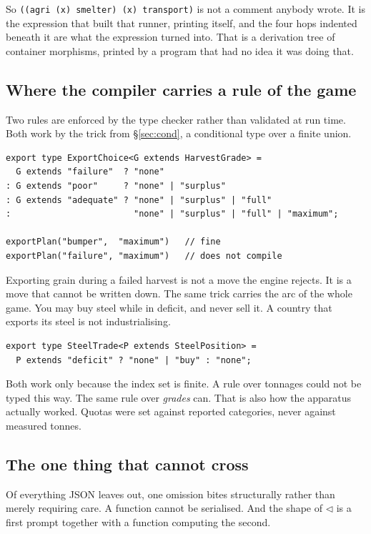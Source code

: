 \documentclass[11pt,a4paper]{article}
\begin{document}
So \texttt{((agri (x) smelter) (x) transport)} is not a comment anybody wrote. It is the expression
that built that runner, printing itself, and the four hops indented beneath it are what the
expression turned into. That is a derivation tree of container morphisms, printed by a program that
had no idea it was doing that.

\subsection{Where the compiler carries a rule of the game}

Two rules are enforced by the type checker rather than validated at run time. Both work by the
trick from \S\ref{sec:cond}, a conditional type over a finite union.

\begin{lstlisting}[language=TS]
export type ExportChoice<G extends HarvestGrade> =
  G extends "failure"  ? "none"
: G extends "poor"     ? "none" | "surplus"
: G extends "adequate" ? "none" | "surplus" | "full"
:                        "none" | "surplus" | "full" | "maximum";

exportPlan("bumper",  "maximum")   // fine
exportPlan("failure", "maximum")   // does not compile
\end{lstlisting}

Exporting grain during a failed harvest is not a move the engine rejects. It is a move that
cannot be written down. The same trick carries the arc of the whole game. You may buy steel while
in deficit, and never sell it. A country that exports its steel is not industrialising.

\begin{lstlisting}[language=TS]
export type SteelTrade<P extends SteelPosition> =
  P extends "deficit" ? "none" | "buy" : "none";
\end{lstlisting}

Both work only because the index set is finite. A rule over tonnages could not be typed this way.
The same rule over \emph{grades} can. That is also how the apparatus actually worked. Quotas were
set against reported categories, never against measured tonnes.

\subsection{The one thing that cannot cross}

Of everything JSON leaves out, one omission bites structurally rather than merely requiring care.
A function cannot be serialised. And the shape of $\lhd$ is a first prompt together with a function
computing the second.
\end{document}
